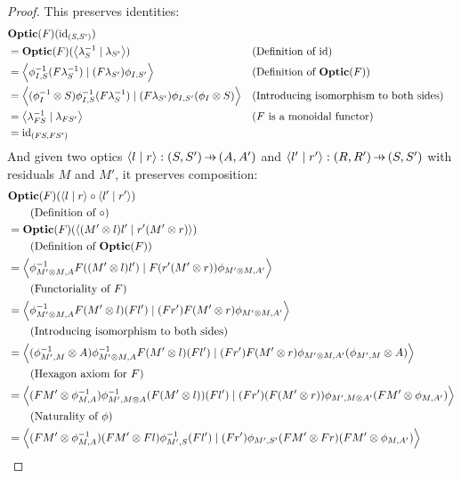 \documentclass[11pt,letterpaper]{article}
\theoremstyle{plain}
\theoremstyle{definition}
\newcommand{\Optic}{\mathbf{Optic}}
\newcommand{\id}{\mathrm{id}}
\newcommand{\rep}[2]{{\ensuremath \left\langle #1 \mid #2 \right\rangle}}
\newcommand{\hto}{\ensuremath{\,\mathaccent\shortmid\rightarrow\,}}
\begin{document}
\begin{proof}
  This preserves identities:
  \begin{align*}
  &\Optic(F)(\id_{(S, S')}) \\
  &= \Optic(F)(\rep{\lambda^{-1}_S}{\lambda_{S'}}) &&\text{(Definition of $\id$)} \\
  &= \rep{\phi^{-1}_{I,S} (F\lambda^{-1}_S)}{(F\lambda_{S'}) \phi_{I,S'}} && \text{(Definition of $\Optic(F)$)} \\
  &= \rep{(\phi_I^{-1} \otimes S) \phi^{-1}_{I,S} (F\lambda^{-1}_S)}{(F\lambda_{S'}) \phi_{I,S'}(\phi_I \otimes S) } && \text{(Introducing isomorphism to both sides)} \\
  &= \rep{\lambda^{-1}_{FS}}{\lambda_{FS'}} &&\text{($F$ is a monoidal functor)} \\
  &= \id_{(FS, FS')}
  \end{align*}
  And given two optics $\rep{l}{r} : (S, S') \hto (A, A')$ and $\rep{l'}{r'} : (R, R') \hto (S, S')$ with residuals $M$ and $M'$, it preserves composition:
\begingroup
\allowdisplaybreaks
\begin{align*}
&\Optic(F)(\rep{l}{r} \circ \rep{l'}{r'})  \\
&\qquad \text{(Definition of $\circ$)} \\
&= \Optic(F)(\rep{(M' \otimes l)l'}{r'(M' \otimes r)}) \\
&\qquad \text{(Definition of $\Optic(F)$)} \\
&= \rep{\phi^{-1}_{M' \otimes M,A} F((M' \otimes l)l')}{F(r'(M' \otimes r)) \phi_{M' \otimes M,A'}} \\
&\qquad \text{(Functoriality of $F$)} \\
&= \rep{\phi^{-1}_{M' \otimes M,A} F(M' \otimes l)(Fl')}{(Fr') F(M' \otimes r) \phi_{M' \otimes M,A'}} \\
&\qquad \text{(Introducing isomorphism to both sides)} \\
&= \rep{(\phi^{-1}_{M', M} \otimes A)\phi^{-1}_{M' \otimes M,A} F(M' \otimes l)(Fl')}{(Fr') F(M' \otimes r) \phi_{M' \otimes M,A'}(\phi_{M', M} \otimes A)} \\
&\qquad \text{(Hexagon axiom for $F$)} \\
&= \rep{(FM' \otimes \phi^{-1}_{M,A})\phi^{-1}_{M',M \otimes A}(F(M' \otimes l)) (Fl')}{(Fr') (F(M' \otimes r)) \phi_{M',M \otimes A'}  (FM' \otimes \phi_{M,A'})} \\
&\qquad \text{(Naturality of $\phi$)} \\
&= \rep{(FM' \otimes \phi^{-1}_{M,A})(FM' \otimes Fl)\phi^{-1}_{M',S} (Fl')}{(Fr') \phi_{M',S'} (FM' \otimes Fr) (FM' \otimes \phi_{M,A'})} \\

\end{align*}
\end{proof}
\end{document}
